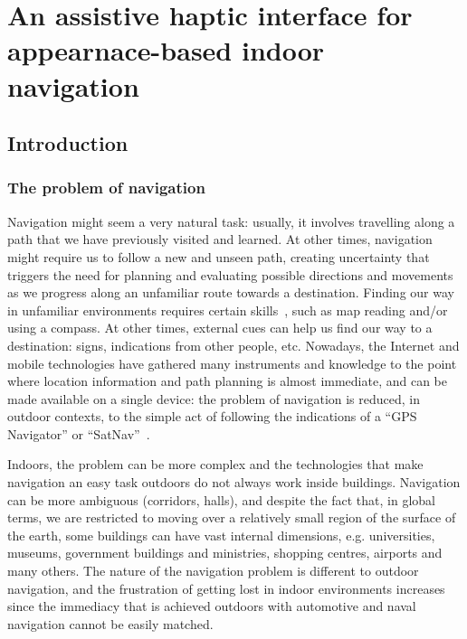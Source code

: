 \chapter{An assistive haptic interface for appearnace-based indoor navigation}\label{ch:assistiveapp}

\section{Introduction}
\label{sec:Intro}

\subsection{The problem of navigation}

Navigation might seem a very natural task: usually, it involves travelling along a path that we have previously visited and learned. At other times, navigation might require us to follow a new and unseen path, creating uncertainty that triggers the need for planning and evaluating possible directions and movements as we progress along an unfamiliar route towards a destination. Finding our way in unfamiliar environments requires certain skills~\citep{foulke1982perception}, such as map reading and/or using a compass. At other times, external cues can help us find our way to a destination: signs, indications from other people, etc. Nowadays, the Internet and mobile technologies have gathered many instruments and knowledge to the point where location information and path planning is almost immediate, and can be made available on a single device: the problem of navigation is reduced, in outdoor contexts, to the simple act of following the indications of a ``GPS Navigator'' or ``SatNav''~\citep{spirkovska2005summary}.

Indoors, the problem can be more complex and the technologies that make navigation an easy task outdoors do not always work inside buildings. Navigation can be more ambiguous (corridors, halls), and despite the fact that, in global terms, we are restricted to moving over a relatively small region of the surface of the earth, some buildings can have vast internal dimensions, e.g. universities, museums, government buildings and ministries, shopping centres, airports and many others. The nature of the navigation problem is different to outdoor navigation, and the frustration of getting lost in indoor environments increases since the immediacy that is achieved outdoors with automotive and naval navigation cannot be easily matched.
 
